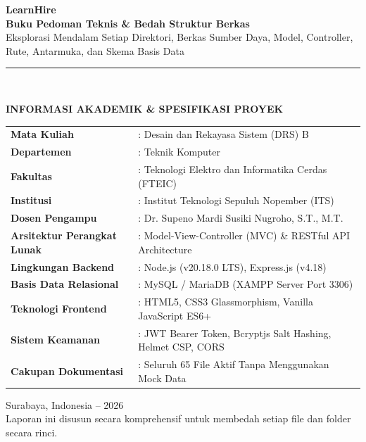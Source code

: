 \documentclass[11pt,a4paper]{article}
\begin{document}
\begin{titlepage}
    \centering
    \vspace*{0.8cm}
    
    {\Huge \textbf{\color{primary}LearnHire}}\\[0.3cm]
    {\LARGE \textbf{\color{accent}Buku Pedoman Teknis \& Bedah Struktur Berkas}}\\[0.25cm]
    {\large \color{secondary}Eksplorasi Mendalam Setiap Direktori, Berkas Sumber Daya, Model, Controller, Rute, Antarmuka, dan Skema Basis Data}\\[1.2cm]
    
    \rule{\linewidth}{1.5pt}\\[1.2cm]
    
    \begin{minipage}{0.88\textwidth}
        \normalsize
        \textbf{\color{primary}INFORMASI AKADEMIK \& SPESIFIKASI PROYEK}\\[0.4cm]
        \begin{tabular}{ll}
            \textbf{Mata Kuliah} & : Desain dan Rekayasa Sistem (DRS) B \\
            \textbf{Departemen} & : Teknik Komputer \\
            \textbf{Fakultas} & : Teknologi Elektro dan Informatika Cerdas (FTEIC) \\
            \textbf{Institusi} & : Institut Teknologi Sepuluh Nopember (ITS) \\
            \textbf{Dosen Pengampu} & : Dr. Supeno Mardi Susiki Nugroho, S.T., M.T. \\
            \textbf{Arsitektur Perangkat Lunak} & : Model-View-Controller (MVC) \& RESTful API Architecture \\
            \textbf{Lingkungan Backend} & : Node.js (v20.18.0 LTS), Express.js (v4.18) \\
            \textbf{Basis Data Relasional} & : MySQL / MariaDB (XAMPP Server Port 3306) \\
            \textbf{Teknologi Frontend} & : HTML5, CSS3 Glassmorphism, Vanilla JavaScript ES6+ \\
            \textbf{Sistem Keamanan} & : JWT Bearer Token, Bcryptjs Salt Hashing, Helmet CSP, CORS \\
            \textbf{Cakupan Dokumentasi} & : Seluruh 65 File Aktif Tanpa Menggunakan Mock Data \\
        \end{tabular}
    \end{minipage}
    
    \vfill
    {\small \color{secondary}Surabaya, Indonesia -- 2026}\\[0.15cm]
    {\footnotesize \color{secondary}Laporan ini disusun secara komprehensif untuk membedah setiap file dan folder secara rinci.}
\end{titlepage}
\end{document}

